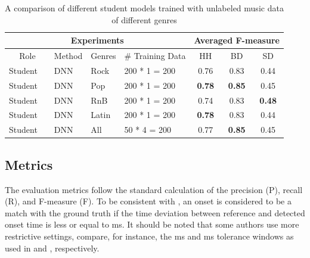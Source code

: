 \documentclass{article}
\begin{document}
\begin{table}
\centering
\begin{tabular*}{\textwidth}{l@{\extracolsep{\fill}}llllccc}
\hline
\multicolumn{5}{c}{Experiments}                               & \multicolumn{3}{c}{Averaged F-measure}           \\ \hline
\multicolumn{2}{c}{Role} & Method & Genres & \# Training Data & HH             & BD             & SD             \\ \hline
Student    &             & DNN    & Rock   & 200 * 1 = 200    & 0.76          & 0.83          & 0.44          \\
Student    &             & DNN    & Pop    & 200 * 1 = 200    & \textbf{0.78} & \textbf{0.85} & 0.45          \\
Student    &             & DNN    & RnB    & 200 * 1 = 200    & 0.74          & 0.83          & \textbf{0.48} \\
Student    &             & DNN    & Latin  & 200 * 1 = 200    & \textbf{0.78} & 0.83          & 0.44          \\
Student    &             & DNN    & All     & 50   * 4 = 200     & 0.77          & \textbf{0.85}          & 0.45          \\ \hline
\end{tabular*}
\caption{A comparison of different student models trained with unlabeled music data of different genres}%
\label{tab:genre_results}
\end{table}


\subsection{Metrics}
The evaluation metrics follow the standard calculation of the precision (P), recall (R), and F-measure (F). To be consistent with \cite{Gillet2008, Wu2015a, Southall2016}, an onset is considered to be a match with the ground truth if the time deviation between reference and detected onset time is less or equal to \unit[50]{ms}. It should be noted that some authors use more restrictive settings, compare, for instance, the \unit[30]{ms} and \unit[20]{ms} tolerance windows as used in \cite{Paulus2009a} and \cite{Vogl2017}, respectively.  
\end{document}
